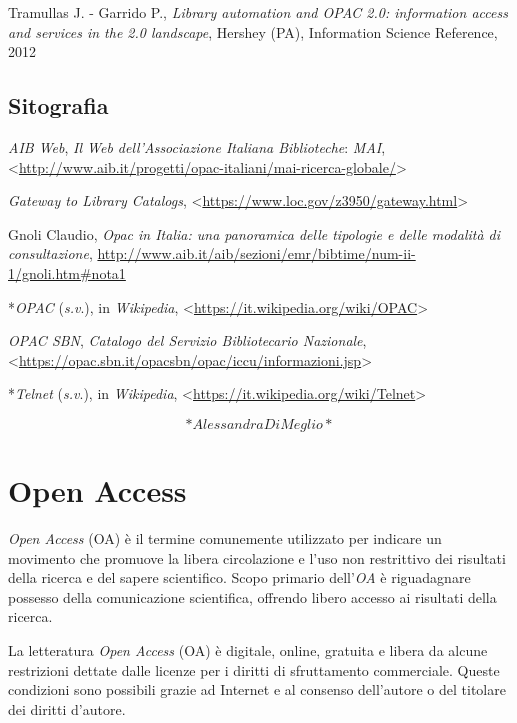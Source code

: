 \documentclass[
  b5paper,
  twoside,
  11pt,
  chapterprefix=false,
  bibliography=totocnumbered,
  parskip=0]{scrbook}
\begin{document}
Tramullas J. - Garrido P., \emph{Library automation and OPAC 2.0: information
access and services in the 2.0 landscape}, Hershey (PA), Information
Science Reference, 2012

\hypertarget{sitografia-24}{%
\section*{Sitografia}\label{sitografia-24}}

\emph{AIB Web}, \emph{Il Web dell'Associazione Italiana Biblioteche}: \emph{MAI},
\textless{}{\url{http://www.aib.it/progetti/opac-italiani/mai-ricerca-globale/}\textgreater{}}

\emph{Gateway to Library Catalogs},
\textless{}{\url{https://www.loc.gov/z3950/gateway.html}\textgreater{}}

Gnoli Claudio, \emph{Opac in Italia: una panoramica delle tipologie e delle
modalità di consultazione},
\href{http://www.aib.it/aib/sezioni/emr/bibtime/num-ii-1/gnoli.htm\#nota1}{{http://www.aib.it/aib/sezioni/emr/bibtime/num-ii-1/gnoli.htm\#nota1}}

*\emph{OPAC} (\emph{s.v}.), in \emph{Wikipedia},
\textless{}{\url{https://it.wikipedia.org/wiki/OPAC}\textgreater{}}

\emph{OPAC SBN}, \emph{Catalogo del Servizio Bibliotecario Nazionale},
\textless{}{\url{https://opac.sbn.it/opacsbn/opac/iccu/informazioni.jsp}\textgreater{}}

*\emph{Telnet} (\emph{s.v}.), in \emph{Wikipedia},
\textless{}{\url{https://it.wikipedia.org/wiki/Telnet}\textgreater{}}

\[*Alessandra Di Meglio*\]

\hypertarget{open-access}{%
\chapter{Open Access}\label{open-access}}

\emph{Open Access} (OA) è il termine comunemente utilizzato per indicare un
movimento che promuove la libera circolazione e l'uso non restrittivo
dei risultati della ricerca e del sapere scientifico. Scopo primario
dell'\emph{OA} è riguadagnare possesso della comunicazione scientifica,
offrendo libero accesso ai risultati della ricerca.

La letteratura \emph{Open Access} (OA) è digitale, online, gratuita e libera
da alcune restrizioni dettate dalle licenze per i diritti di
sfruttamento commerciale. Queste condizioni sono possibili grazie ad
Internet e al consenso dell'autore o del titolare dei diritti
d'autore.
\end{document}
